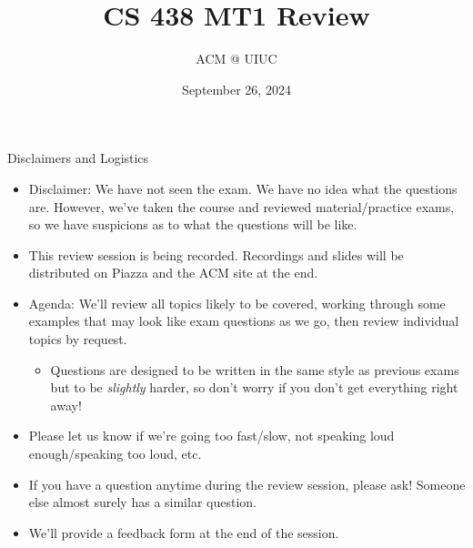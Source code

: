 \documentclass{beamer}
\title[ACM fun]{CS 438 MT1 Review}
\author{ACM @ UIUC}
\date{September 26, 2024}
\begin{document}
\begin{frame}
  \titlepage
\end{frame}

\begin{frame}[t]{Disclaimers and Logistics}
  \begin{itemize}
  \item \alert{Disclaimer:} We have not seen the exam. We have no idea what the questions are. However, we've taken the course and reviewed material/practice exams, so we have \alert{suspicions} as to what the questions will be like.
  \item This review session is being recorded. Recordings and slides will be distributed on Piazza and the ACM site at the end.
  \item \alert{Agenda:} We'll review all topics likely to be covered, working through some examples that may look like exam questions as we go, then review individual topics by request.
  \begin{itemize}
      \item Questions are designed to be written in the same style as previous exams but to be \textit{slightly} harder, so don't worry if you don't get everything right away!
  \end{itemize}
  \item Please let us know if we're going too fast/slow, not speaking loud enough/speaking too loud, etc.
  \item If you have a question anytime during the review session, please ask! Someone else almost surely has a similar question.
  \item We'll provide a feedback form at the end of the session.
  \end{itemize}
\end{frame}
\end{document}
